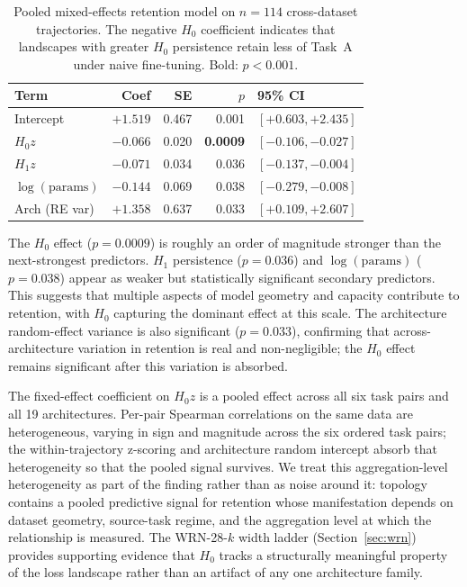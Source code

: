 \documentclass[10pt,twocolumn]{article}
\begin{document}
\begin{table}[t]
\centering
\caption{Pooled mixed-effects retention model on $n = 114$ cross-dataset trajectories. The negative $H_0$ coefficient indicates that landscapes with greater $H_0$ persistence retain less of Task~A under naive fine-tuning. Bold: $p < 0.001$.}
\label{tab:phase8_q1}
\small
\setlength{\tabcolsep}{4pt}
\begin{tabular}{@{}lrrrl@{}}
\toprule
Term & Coef & SE & $p$ & 95\% CI \\
\midrule
Intercept     & $+1.519$ & 0.467 & 0.001 & $[+0.603, +2.435]$ \\
$H_0 z$       & $-0.066$ & 0.020 & \textbf{0.0009} & $[-0.106, -0.027]$ \\
$H_1 z$       & $-0.071$ & 0.034 & 0.036 & $[-0.137, -0.004]$ \\
$\log(\text{params})$ & $-0.144$ & 0.069 & 0.038 & $[-0.279, -0.008]$ \\
Arch (RE var) & $+1.358$ & 0.637 & 0.033 & $[+0.109, +2.607]$ \\
\bottomrule
\end{tabular}
\end{table}

The $H_0$ effect ($p = 0.0009$) is roughly an order of magnitude stronger than the next-strongest predictors. $H_1$ persistence ($p = 0.036$) and $\log(\text{params})$ ($p = 0.038$) appear as weaker but statistically significant secondary predictors. This suggests that multiple aspects of model geometry and capacity contribute to retention, with $H_0$ capturing the dominant effect at this scale. The architecture random-effect variance is also significant ($p = 0.033$), confirming that across-architecture variation in retention is real and non-negligible; the $H_0$ effect remains significant after this variation is absorbed.

The fixed-effect coefficient on $H_0 z$ is a pooled effect across all six task pairs and all 19 architectures. Per-pair Spearman correlations on the same data are heterogeneous, varying in sign and magnitude across the six ordered task pairs; the within-trajectory z-scoring and architecture random intercept absorb that heterogeneity so that the pooled signal survives. We treat this aggregation-level heterogeneity as part of the finding rather than as noise around it: topology contains a pooled predictive signal for retention whose manifestation depends on dataset geometry, source-task regime, and the aggregation level at which the relationship is measured. The WRN-28-$k$ width ladder (Section~\ref{sec:wrn}) provides supporting evidence that $H_0$ tracks a structurally meaningful property of the loss landscape rather than an artifact of any one architecture family.
\end{document}
